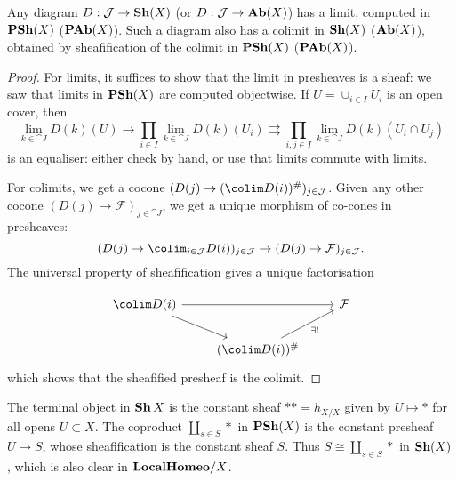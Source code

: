 \documentclass[../main.tex]{subfiles}
\begin{document}
\begin{thm}\label{thm:limits-colimits-sheaves}
	Any diagram $D: \mathcal{J} \to \operatorname{\mathbf{Sh}}(X)$ (or $D: \mathcal{J} \to \operatorname{\mathbf{Ab}}(X)$) has a limit, computed in $\operatorname{\mathbf{PSh}}(X)$ ($\operatorname{\mathbf{PAb}}(X)$).
	Such a diagram also has a colimit in $\operatorname{\mathbf{Sh}}(X)$ ($\operatorname{\mathbf{Ab}}(X)$), obtained by sheafification of the colimit in $\operatorname{\mathbf{PSh}}(X)$ ($\operatorname{\mathbf{PAb}}(X)$).
\end{thm}
\begin{proof}
   For limits, it suffices to show that the limit in presheaves is a sheaf: we saw that limits in $\operatorname{\mathbf{PSh}}(X)$ are computed objectwise. If $U = \cup_{i \in I}U_i$ is an open cover, then \[
    \lim_{k \in \cat J}D(k)(U) \to \prod_{i \in I} \lim_{k \in \cat J}D(k)(U_i) \rightrightarrows \prod_{i, j \in I} \lim_{k \in \cat J} D(k)(U_i \cap U_j)
   \] is an equaliser: either check by hand, or use that limits commute with limits.

   For colimits, we get a cocone $(D(j) \to (\colim D(i))^\#)_{j \in \cat J}$. Given any other cocone $(D(j) \to \mathcal{F})_{j \in \cat J}$, we get a unique morphism of co-cones in presheaves:
   \[
    (D(j) \to \colim_{i \in \cat J} D(i))_{j \in \cat J} \to (D(j) \to \mathcal{F})_{j \in \cat J}.
   \] The universal property of sheafification gives a unique factorisation 
   
  \[\begin{tikzcd}
\colim D(i) \arrow[rr] \arrow[rd] &                                           & \mathcal{F} \\
                                  & (\colim D(i))^\# \arrow[ru, "\exists !"'] &            
\end{tikzcd}\] which shows that the sheafified presheaf is the colimit. 
\end{proof}
\begin{exmp}
    The terminal object in $\operatorname{\mathbf{Sh}}{X}$ is the constant sheaf $**=h_{X/X}$ given by $U\mapsto *$ for all opens $U \subset X$. The coproduct $\coprod_{s \in S} *$ in $\operatorname{\mathbf{PSh}}(X)$ is the constant presheaf $U \mapsto S$, whose sheafification is the constant sheaf $\underline{S}$. Thus $\underline{S} \cong \coprod_{s \in S} *$ in $\operatorname{\mathbf{Sh}}(X)$, which is also clear in $\mathbf{LocalHomeo}{/X}$. 
\end{exmp}
\end{document}

